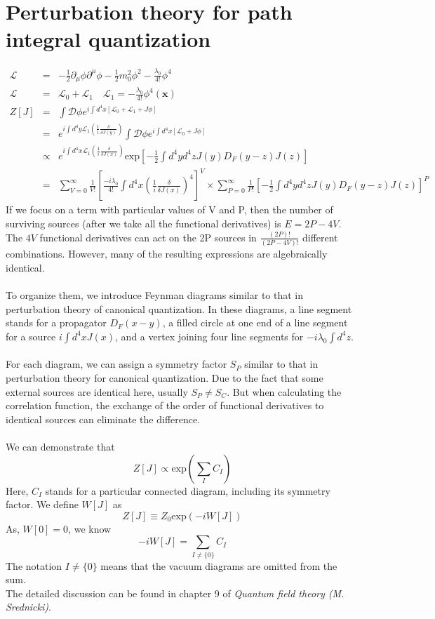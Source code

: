 \section{Perturbation theory for path integral quantization}
\begin{eqnarray}
\mathcal{L} &=& -\frac{1}{2}\partial_{\mu} \phi \partial^{\mu} \phi -\frac{1}{2}m_0^2 \phi^2 -\frac{\lambda_0}{4!}\phi^4 \nonumber \\
\mathcal{L} &=& \mathcal{L}_0 + \mathcal{L}_1 \quad \mathcal{L}_1 =- \frac{\lambda_0}{4!} \phi^4 (\bm{x}) \nonumber \\
Z[J] &=& \int \mathcal{D}\phi e^{i\int d^4x [\mathcal{L}_0 + \mathcal{L}_1 + J\phi]} \nonumber \\
&=& e^{i\int d^4y \mathcal{L}_1(\frac{1}{i} \frac{\delta}{\delta J(y)})} \int \mathcal{D}\phi e^{i\int d^4x [\mathcal{L}_0 + J\phi]} \nonumber \\
&\propto & e^{i\int d^4x \mathcal{L}_1(\frac{1}{i} \frac{\delta}{\delta J(x)})} \mathrm{exp} [-\frac{1}{2} \int d^4y d^4z J(y)D_F(y-z)J(z)] \nonumber \\
& =& \sum_{V=0}^{\infty} \frac{1}{V!} [ \frac{-i\lambda_0}{4!} \int d^4x (\frac{1}{i} \frac{\delta}{\delta J(x)})^4]^V \times \sum_{P=0}^{\infty} \frac{1}{P!} [-\frac{1}{2} \int d^4y d^4z J(y)D_F(y-z)J(z)]^P \nonumber
\end{eqnarray}
If we focus on a term with particular values of V and P, then
the number of surviving sources (after we take all the functional derivatives) is $E = 2P-4V$. The $4V$ functional derivatives can act on the 2P sources in $\frac{(2P)!}{(2P-4V)!}$ different combinations. However, many of the resulting expressions are algebraically identical.\\ \\
To organize them, we introduce Feynman diagrams similar to that in perturbation theory of canonical quantization. In these diagrams, a line segment stands for a propagator $D_F(x-y)$, a filled circle at one end of a line segment for a source $i\int d^4x J(x)$, and a vertex joining four line segments for $-i\lambda_0 \int d^4 z$.\\ \\
For each diagram, we can assign a symmetry factor $S_P$ similar to that in perturbation theory for canonical quantization. Due to the fact that some external sources are identical here, usually $S_P \neq S_C$. But when calculating the correlation function, the exchange of the order of functional derivatives to identical sources can eliminate the difference.\\ \\
We can demonstrate that
\[Z[J] \propto \mathrm{exp}(\sum_I C_I)\]
Here, $C_I$ stands for a particular connected diagram, including its symmetry factor. We define $W[J]$ as
\[Z[J] \equiv Z_0 \mathrm{exp}(-iW[J])\]
As, $W[0]=0$, we know
\[-iW[J] = \sum_{I \neq \{0\}} C_I\]
The notation $I\neq \{0\}$ means that the vacuum diagrams are omitted from the sum.\\
The detailed discussion can be found in chapter 9 of \emph{Quantum field theory (M. Srednicki)}.

